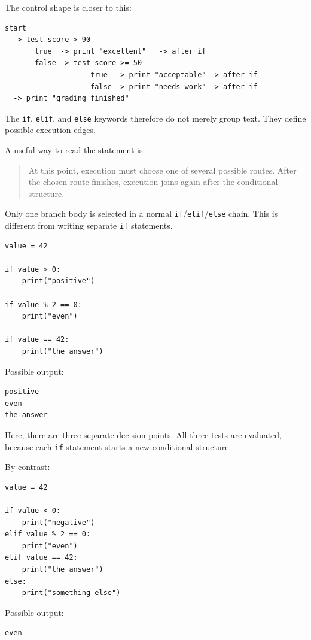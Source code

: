 The control shape is closer to this:

\begin{verbatim}
start
  -> test score > 90
       true  -> print "excellent"   -> after if
       false -> test score >= 50
                    true  -> print "acceptable" -> after if
                    false -> print "needs work" -> after if
  -> print "grading finished"
\end{verbatim}

The \texttt{if}, \texttt{elif}, and \texttt{else} keywords therefore do not merely group text. They define possible execution edges.

A useful way to read the statement is:

\begin{quote}
At this point, execution must choose one of several possible routes. After the chosen route finishes, execution joins again after the conditional structure.
\end{quote}

Only one branch body is selected in a normal \texttt{if}/\texttt{elif}/\texttt{else} chain. This is different from writing separate \texttt{if} statements.

\begin{verbatim}
value = 42

if value > 0:
    print("positive")

if value % 2 == 0:
    print("even")

if value == 42:
    print("the answer")
\end{verbatim}

Possible output:

\begin{verbatim}
positive
even
the answer
\end{verbatim}

Here, there are three separate decision points. All three tests are evaluated, because each \texttt{if} statement starts a new conditional structure.

By contrast:

\begin{verbatim}
value = 42

if value < 0:
    print("negative")
elif value % 2 == 0:
    print("even")
elif value == 42:
    print("the answer")
else:
    print("something else")
\end{verbatim}

Possible output:

\begin{verbatim}
even
\end{verbatim}

